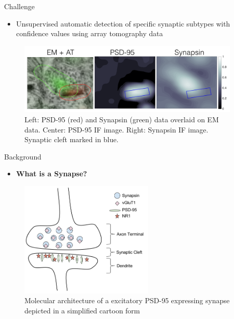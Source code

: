 \documentclass[final, table]{beamer}
\newlength{\sepwid}
\newlength{\onecolwid}
\begin{document}
\begin{frame}[t]  
\begin{columns}[t]  %

\begin{column}{\sepwid}\end{column}  %
\begin{column}{\onecolwid} 

\begin{block}{Challenge} 
\begin{itemize} 
\item Unsupervised automatic detection of specific synaptic subtypes with confidence values using array tomography data
\end{itemize} 


\begin{figure}
\centering
\includegraphics[width=1\textwidth]{figs/em_if_outlines}
\caption{Left: PSD-95 (red) and Synapsin (green) data overlaid on EM data.  Center: PSD-95 IF image. Right: Synapsin IF image. Synaptic cleft marked in blue.}
\label{fig:synapseOverview}
\end{figure}

\end{block}

\begin{block}{Background} 
\begin{itemize} 
\item \textbf{What is a Synapse?}
\end{itemize} 
\begin{figure}
\centering
\includegraphics[width=0.6\textwidth]{figs/Chemical_Synapse}
\caption{Molecular architecture of a excitatory PSD-95 expressing synapse depicted in a simplified cartoon form}
\label{fig:Chemical_Synapse}
\end{figure}


\end{block}
\end{column}
\end{columns}
\end{frame}
\end{document}
